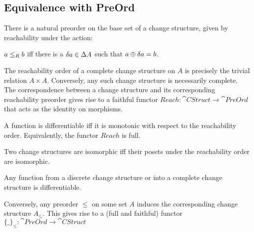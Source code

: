 \subsection{Equivalence with PreOrd}

There is a natural preorder on the base set of a change structure, given by reachability
 under the action:
\begin{defn}
  $a \leq_R b$ iff there is a $\delta a \in \Delta A$ such that $a \oplus
  \delta a = b$.
\end{defn}

The reachability order of a complete change structure on $A$ is precisely the trivial relation
$A \times A$. Conversely, any such change structure is necessarily complete. The correspondence
between a change structure and its corresponding reachability preorder gives rise to
a faithful functor $Reach : \cat{CStruct} \rightarrow \cat{PreOrd}$ that acts as the identity
on morphisms.

\begin{prop}
  A function is differentiable iff it is monotonic with respect to the
  reachability order. Equivalently, the functor $Reach$ is full.
\end{prop}

\begin{corollary}
  Two change structures are isomorphic iff their posets under the reachability
  order are isomorphic.
\end{corollary}

\begin{corollary}
  Any function from a discrete change structure or into a complete change
  structure is differentiable.
\end{corollary}

Conversely, any preorder $\leq$ on some set $A$ induces the corresponding change structure
$A_\leq$. This gives rise to a (full and faithful) functor $\{\_\}_\leq : \cat{PreOrd} \rightarrow \cat{CStruct}$

